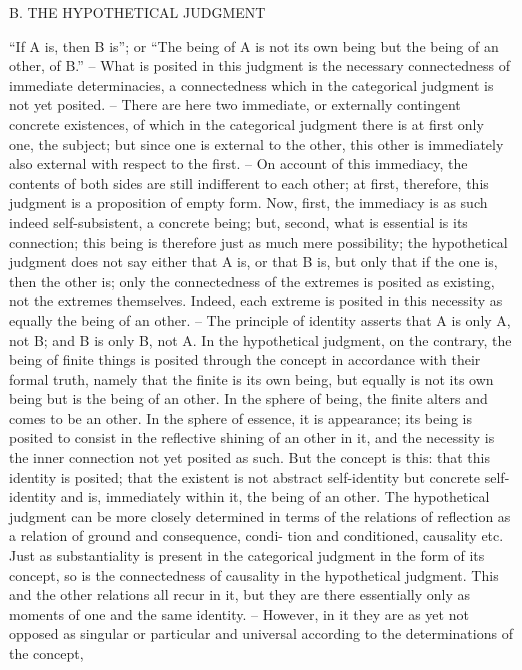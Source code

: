 B. THE HYPOTHETICAL JUDGMENT

“If A is, then B is”; or “The being of A is not its own being but the being
of an other, of B.” – What is posited in this judgment is the necessary
connectedness of immediate determinacies, a connectedness which in the
categorical judgment is not yet posited. – There are here two immediate,
or externally contingent concrete existences, of which in the categorical
judgment there is at first only one, the subject; but since one is external
to the other, this other is immediately also external with respect to the
first. – On account of this immediacy, the contents of both sides are still
indifferent to each other; at first, therefore, this judgment is a proposition
of empty form. Now, first, the immediacy is as such indeed self-subsistent,
a concrete being; but, second, what is essential is its connection; this being
is therefore just as much mere possibility; the hypothetical judgment does
not say either that A is, or that B is, but only that if the one is, then the
other is; only the connectedness of the extremes is posited as existing, not
the extremes themselves. Indeed, each extreme is posited in this necessity
as equally the being of an other. – The principle of identity asserts that A is
only A, not B; and B is only B, not A. In the hypothetical judgment, on
the contrary, the being of finite things is posited through the concept in
accordance with their formal truth, namely that the finite is its own being,
but equally is not its own being but is the being of an other. In the sphere
of being, the finite alters and comes to be an other. In the sphere of essence,
it is appearance; its being is posited to consist in the reflective shining of an
other in it, and the necessity is the inner connection not yet posited as such.
But the concept is this: that this identity is posited; that the existent is not
abstract self-identity but concrete self-identity and is, immediately within it,
the being of an other.
The hypothetical judgment can be more closely determined in terms of
the relations of reflection as a relation of ground and consequence, condi-
tion and conditioned, causality etc. Just as substantiality is present in the
categorical judgment in the form of its concept, so is the connectedness
of causality in the hypothetical judgment. This and the other relations all
recur in it, but they are there essentially only as moments of one and the
same identity. – However, in it they are as yet not opposed as singular or
particular and universal according to the determinations of the concept,
